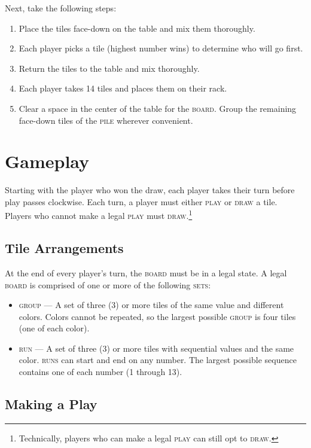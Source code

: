 \documentclass{article}
\begin{document}
\begin{multicols*}{3}
\medskip
\noindent Next, take the following steps:

\begin{enumerate}
	\item Place the tiles face-down on the table and mix them thoroughly.
	\item \label{itm:setup-first-player}Each player picks a tile (highest
		number wins) to determine who will go first.
	\item Return the tiles to the table and mix thoroughly.
	\item Each player takes 14 tiles and places them on their rack.
	\item Clear a space in the center of the table for the \textsc{board}.
		Group the remaining face-down tiles of the \textsc{pile}
		wherever convenient.
\end{enumerate}

\section*{Gameplay}
Starting with the player who won the draw, each player takes their turn before
	play passes clockwise. Each turn, a player must either \textsc{play} or
	\textsc{draw} a tile. Players who cannot make a legal \textsc{play} must
	\textsc{draw}.\footnote{Technically, players who can make a legal
	\textsc{play} can still opt to \textsc{draw}.}

\subsection*{Tile Arrangements}

At the end of every player's turn, the \textsc{board} must be in a legal state.
A legal \textsc{board} is comprised of one or more of the following
\textsc{sets}:

\begin{itemize}
	\item \textsc{group} --- A set of three (3) or more tiles of the same
		value and different colors. Colors cannot be repeated, so the
		largest possible \textsc{group} is four tiles (one of each
		color).
	\item \textsc{run} --- A set of three (3) or more tiles with sequential
		values and the same color. \textsc{runs} can start and end on
		any number. The largest possible sequence contains one of each
		number (1 through 13).
\end{itemize}

\subsection*{Making a Play}


\end{multicols*}
\end{document}
